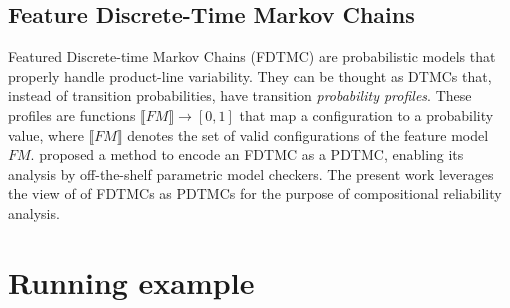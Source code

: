\subsection{Feature Discrete-Time Markov Chains
	\label{subsec:featureDiscreteTimeMarkovChains}}

Featured Discrete-time Markov Chains (FDTMC) \cite{rodrigues_modeling_2015} are
probabilistic models that properly handle product-line variability.  They can be
thought as DTMCs that, instead of transition probabilities, have transition
\emph{probability profiles}.  These profiles are functions $\llbracket
\mathit{FM} \rrbracket \to [0,1]$ that map a configuration to a probability
value, where $\llbracket \mathit{FM} \rrbracket$ denotes the set of valid
configurations of the feature model $\mathit{FM}$.
\citet{rodrigues_modeling_2015} proposed a method to encode an FDTMC as a PDTMC,
enabling its analysis by off-the-shelf parametric model checkers. The present
work leverages the view of \citet{rodrigues_modeling_2015} of FDTMCs
as PDTMCs for the purpose of compositional reliability analysis.










\section{Running example \label{sec:runningExample}}

